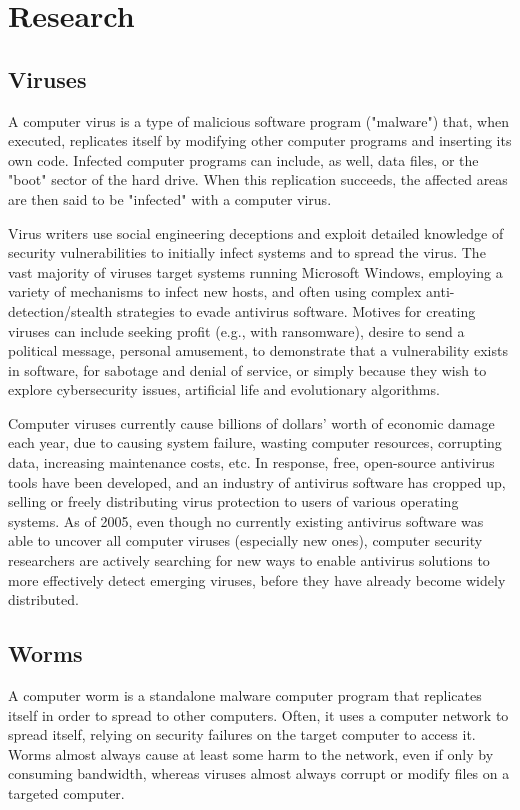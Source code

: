 \documentclass{article}
\begin{document}
\section{Research}
\subsection*{Viruses}
A computer virus is a type of malicious software program ("malware") that, when executed, replicates itself by modifying other computer programs and inserting its own code. Infected computer programs can include, as well, data files, or the "boot" sector of the hard drive. When this replication succeeds, the affected areas are then said to be "infected" with a computer virus.

Virus writers use social engineering deceptions and exploit detailed knowledge of security vulnerabilities to initially infect systems and to spread the virus. The vast majority of viruses target systems running Microsoft Windows, employing a variety of mechanisms to infect new hosts, and often using complex anti-detection/stealth strategies to evade antivirus software. Motives for creating viruses can include seeking profit (e.g., with ransomware), desire to send a political message, personal amusement, to demonstrate that a vulnerability exists in software, for sabotage and denial of service, or simply because they wish to explore cybersecurity issues, artificial life and evolutionary algorithms.

Computer viruses currently cause billions of dollars' worth of economic damage each year, due to causing system failure, wasting computer resources, corrupting data, increasing maintenance costs, etc. In response, free, open-source antivirus tools have been developed, and an industry of antivirus software has cropped up, selling or freely distributing virus protection to users of various operating systems. As of 2005, even though no currently existing antivirus software was able to uncover all computer viruses (especially new ones), computer security researchers are actively searching for new ways to enable antivirus solutions to more effectively detect emerging viruses, before they have already become widely distributed.

\subsection*{Worms}
A computer worm is a standalone malware computer program that replicates itself in order to spread to other computers. Often, it uses a computer network to spread itself, relying on security failures on the target computer to access it. Worms almost always cause at least some harm to the network, even if only by consuming bandwidth, whereas viruses almost always corrupt or modify files on a targeted computer.
\end{document}
